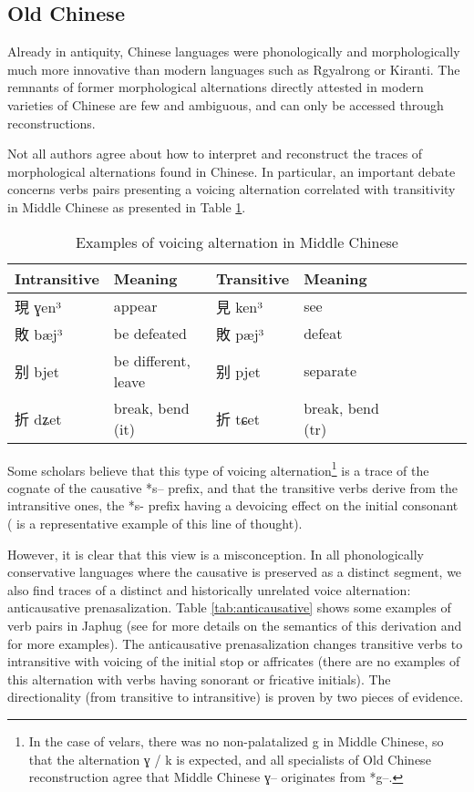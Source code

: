 \documentclass[oldfontcommands,oneside,a4paper,11pt]{article}
\newcommand{\ipa}[1]{{\phon \mbox{#1}}} %
\newcommand{\zh}[1]{{\cn #1}}
\begin{document}
\subsection{Old Chinese}
Already in antiquity, Chinese languages were phonologically and morphologically much more innovative than modern languages such as Rgyalrong or Kiranti. The remnants of former morphological alternations directly attested in modern varieties of Chinese are few and ambiguous, and can only be accessed through reconstructions. 

Not all authors agree about how to interpret and reconstruct the traces of morphological alternations found in Chinese. In particular, an important debate concerns verbs pairs presenting a voicing alternation correlated with transitivity in Middle Chinese as presented in Table \ref{tab:mc.voicing}.

\begin{table}[h]
\caption{Examples of voicing alternation in Middle Chinese}\label{tab:mc.voicing} \centering
\begin{tabular}{lllllllll} \toprule
Intransitive &Meaning & Transitive&Meaning \\
\midrule
 \zh{現} \ipa{ɣen³}  & appear &  \zh{見} \ipa{ken³}  & see \\
 \zh{敗} \ipa{bæj³}  & be defeated &  \zh{敗} \ipa{pæj³}  & defeat \\
  \zh{别} \ipa{bjet}  & be different, leave &  \zh{别} \ipa{pjet}  & separate \\
    \zh{折} \ipa{dʑet}  & break, bend (it) &  \zh{折} \ipa{tɕet}  & break, bend (tr) \\
\bottomrule
\end{tabular}
\end{table}
Some scholars believe that this type of voicing alternation\footnote{In the case of velars, there was no non-palatalized \ipa{g} in Middle Chinese, so that the alternation  \ipa{ɣ} / \ipa{k} is expected, and all specialists of Old Chinese reconstruction agree that Middle Chinese \ipa{ɣ}-- originates from *\ipa{g}--.} is a trace of the cognate of the causative *\ipa{s--} prefix, and that the transitive verbs derive from the intransitive ones, the *\ipa{s-} prefix having a devoicing effect on the initial consonant (\citealt{mei12caus} is a representative example of this line of thought). 

However, it is clear that this view is a misconception. In all phonologically conservative languages where the causative is preserved as a distinct segment, we also find traces of a distinct and historically unrelated voice alternation: anticausative prenasalization. Table \ref{tab:anticausative} shows some examples of verb pairs in Japhug (see \citealt{jacques12demotion, jacques15spontaneous} for more details on the semantics of this derivation and for more examples). The anticausative prenasalization changes transitive verbs to intransitive with voicing of the initial stop or affricates (there are no examples of this alternation with verbs having sonorant or fricative initials). The directionality (from transitive to intransitive) is proven by two pieces of evidence.
\end{document}
